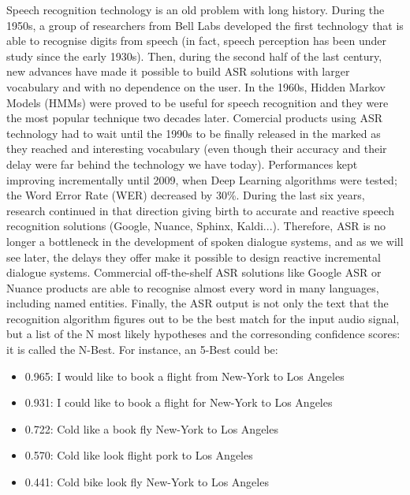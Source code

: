             Speech recognition technology is an old problem with long history. During the 1950s, a group of researchers from Bell Labs developed the first technology that is able to recognise digits from speech (in fact, speech perception has been under study since the early 1930s). Then, during the second half of the last century, new advances have made it possible to build ASR solutions with larger vocabulary and with no dependence on the user. In the 1960s, Hidden Markov Models (HMMs) were proved to be useful for speech recognition and they were the most popular technique two decades later. Comercial products using ASR technology had to wait until the 1990s to be finally released in the marked as they reached and interesting vocabulary (even though their accuracy and their delay were far behind the technology we have today). Performances kept improving incrementally until 2009, when Deep Learning algorithms were tested; the Word Error Rate (WER) decreased by 30\%. During the last six years, research continued in that direction giving birth to accurate and reactive speech recognition solutions (Google, Nuance, Sphinx, Kaldi...). Therefore, ASR is no longer a bottleneck in the development of spoken dialogue systems, and as we will see later, the delays they offer make it possible to design reactive incremental dialogue systems. Commercial off-the-shelf ASR solutions like Google ASR or Nuance products are able to recognise almost every word in many languages, including named entities. Finally, the ASR output is not only the text that the recognition algorithm figures out to be the best match for the input audio signal, but a list of the N most likely hypotheses and the corresonding confidence scores: it is called the N-Best. For instance, an 5-Best could be:

            \begin{itemize}
              \item 0.965: I would like to book a flight from New-York to Los Angeles
              \item 0.931: I could like to book a flight for New-York to Los Angeles
              \item 0.722: Cold like a book fly New-York to Los Angeles
              \item 0.570: Cold like look flight pork to Los Angeles
              \item 0.441: Cold bike look fly New-York to Los Angeles  
            \end{itemize}

